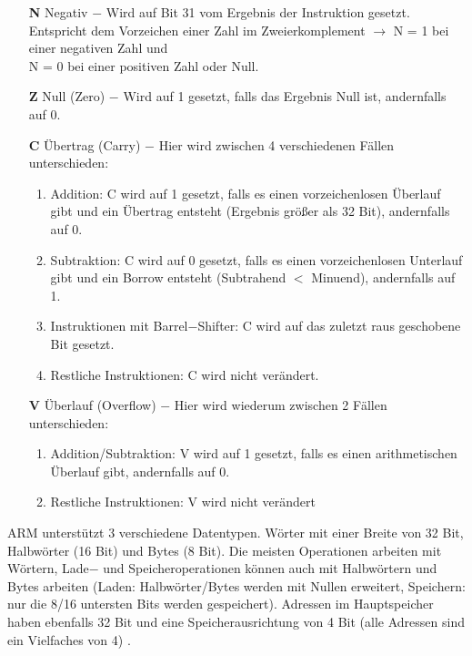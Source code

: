 \documentclass[a4paper, 11pt, onecolumn]{article}
\begin{document}
\begin{itemize}[labelindent=1.5em,labelsep=0.5cm,leftmargin=*]
\item[\textbf{N}] Negativ $-$ Wird auf Bit 31 vom Ergebnis der Instruktion gesetzt. Entspricht dem Vorzeichen einer Zahl im Zweierkomplement $\rightarrow$ N = 1 bei einer negativen Zahl und\\N = 0 bei einer positiven Zahl oder Null.
\item[\textbf{Z}] Null (Zero) $-$ Wird auf 1 gesetzt, falls das Ergebnis Null ist, andernfalls auf 0.
\item[\textbf{C}] Übertrag (Carry) $-$ Hier wird zwischen 4 verschiedenen Fällen unterschieden:
\begin{enumerate}[labelindent=0em,labelsep=0.5cm,leftmargin=*]
\item Addition: C wird auf 1 gesetzt, falls es einen vorzeichenlosen Überlauf gibt und ein Übertrag entsteht (Ergebnis größer als 32 Bit), andernfalls auf 0.
\item Subtraktion: C wird auf 0 gesetzt, falls es einen vorzeichenlosen Unterlauf gibt und ein Borrow entsteht (Subtrahend $<$ Minuend), andernfalls auf 1.
\item Instruktionen mit Barrel$-$Shifter: C wird auf das zuletzt raus geschobene Bit gesetzt.
\item Restliche Instruktionen: C wird nicht verändert.
\end{enumerate}
\item[\textbf{V}] Überlauf (Overflow) $-$ Hier wird wiederum zwischen 2 Fällen unterschieden:
\begin{enumerate}[labelindent=0em,labelsep=0.5cm,leftmargin=*]
\item Addition/Subtraktion: V wird auf 1 gesetzt, falls es einen arithmetischen Überlauf gibt, andernfalls auf 0.
\item Restliche Instruktionen: V wird nicht verändert
\end{enumerate}
\end{itemize}

ARM unterstützt 3 verschiedene Datentypen. Wörter mit einer Breite von 32 Bit, Halbwörter (16 Bit) und Bytes (8 Bit). Die meisten Operationen arbeiten mit Wörtern, Lade$-$ und Speicheroperationen können auch mit Halbwörtern und Bytes arbeiten (Laden: Halbwörter/Bytes werden mit Nullen erweitert, Speichern: nur die 8/16 untersten Bits werden gespeichert). Adressen im Hauptspeicher haben ebenfalls 32 Bit und eine Speicherausrichtung von 4 Bit (alle Adressen sind ein Vielfaches von 4) \cite{arm:2005}. 
\end{document}
